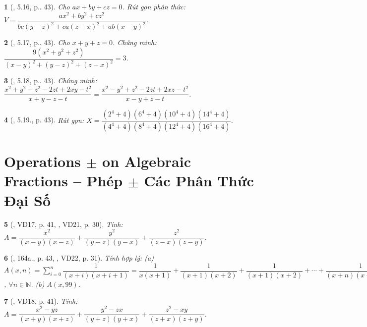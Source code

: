 \documentclass{article}
\newtheorem{baitoan}{}
\begin{document}
\begin{baitoan}[\cite{TLCT_THCS_Toan_8_dai_so}, 5.16, p.. 43]
	Cho $ax + by + cz = 0$. Rút gọn phân thức: $V = \dfrac{ax^2 + by^2 + cz^2}{bc(y - z)^2 + ca(z - x)^2 + ab(x - y)^2}$.
\end{baitoan}

\begin{baitoan}[\cite{TLCT_THCS_Toan_8_dai_so}, 5.17, p.. 43]
	Cho $x + y + z = 0$. Chứng minh: $\dfrac{9(x^2 + y^2 + z^2)}{(x - y)^2 + (y - z)^2 + (z - x)^2} = 3$.
\end{baitoan}

\begin{baitoan}[\cite{TLCT_THCS_Toan_8_dai_so}, 5.18, p.. 43]
	Chứng minh: $\dfrac{x^2 + y^2 - z^2 - 2zt + 2xy - t^2}{x + y - z - t} = \dfrac{x^2 - y^2 + z^2 - 2zt + 2xz - t^2}{x - y + z - t}$.
\end{baitoan}

\begin{baitoan}[\cite{TLCT_THCS_Toan_8_dai_so}, 5.19., p. 43]
	Rút gọn: $X = \dfrac{(2^4 + 4)(6^4 + 4)(10^4 + 4)(14^4 + 4)}{(4^4 + 4)(8^4 + 4)(12^4 + 4)(16^4 + 4)}$.
\end{baitoan}


\section{Operations $\pm$ on Algebraic Fractions -- Phép $\pm$ Các Phân Thức Đại Số}

\begin{baitoan}[\cite{Tuyen_Toan_8_old}, VD17, p. 41, \cite{Tuyen_Toan_8}, VD21, p. 30]
	Tính: $A = \dfrac{x^2}{(x - y)(x - z)} + \dfrac{y^2}{(y - z)(y - x)} + \dfrac{z^2}{(z - x)(z - y)}$.
\end{baitoan}

\begin{baitoan}[\cite{Tuyen_Toan_8_old}, 164a., p. 43, \cite{Tuyen_Toan_8}, VD22, p. 31]
	Tính hợp lý: (a) $A(x,n) = \sum_{i=0}^n \dfrac{1}{(x + i)(x + i + 1)} = \dfrac{1}{x(x + 1)} + \dfrac{1}{(x + 1)(x + 2)} + \dfrac{1}{(x + 1)(x + 2)} + \cdots + \dfrac{1}{(x + n)(x + n + 1)}$, $\forall n\in\mathbb{N}$. (b) $A(x,99)$.
\end{baitoan}

\begin{baitoan}[\cite{Tuyen_Toan_8_old}, VD18, p. 41]
	Tính: $A = \dfrac{x^2 - yz}{(x + y)(x + z)} + \dfrac{y^2 - zx}{(y + z)(y + x)} + \dfrac{z^2 - xy}{(z + x)(z + y)}$.
\end{baitoan}
\end{document}
